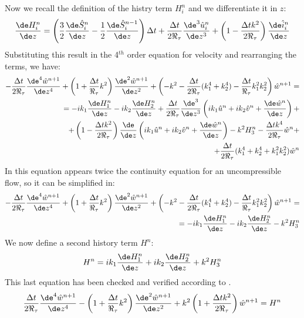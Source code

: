 Now we recall the definition of the histry term $H_i^n$ and we differentiate it in $z$:
\[
\frac{\de H_i^n}{\de z}=\left(\frac 3 2\frac{\de \hat S_i^n}{\de z}-\frac 1 2 \frac{\de \hat S_i^{n-1}}{\de z}\right)\Delta t+\frac{\Delta t}{2\Re_\tau}\frac{\de^3\hat u_i^n}{\de z^3}+\left(1-\frac{\Delta t k^2}{2\Re_\tau}\right)\frac{\de \hat i_i^n}{\de z}
\]
Substituting this result in the 4$^{th}$ order equation for velocity and rearranging the terms, we have:
\[
\begin{split}
-\frac{\Delta t}{2\Re_\tau}\frac{\de^4\hat w^{n+1}}{\de z^4}+\left(1+\frac{\Delta t}{\Re_\tau}k^2 \right)\frac{\de^2 \hat w^{n+1}}{\de z^2}+ \left(-k^2-\frac{\Delta t}{2\Re_\tau}(k_1^4+k_2^4)-\frac{\Delta t}{\Re_\tau}k_1^2k_2^2  \right)\hat w^{n+1}=\\
=-ik_1\frac{\de H_1^n}{\de z}-ik_2\frac{\de H_2^n}{\de z}+\frac{\Delta t}{2\Re_\tau}\frac{\de^3}{\de z^3}\left(ik_1\hat u^n+ik_2\hat v^n+\frac{\de\hat w^n}{\de z}  \right)+\\
+\left(1-\frac{\Delta t k^2}{2\Re_\tau}\right)\frac{\de}{\de z}\left(ik_1\hat u^n+ik_2\hat v^n+\frac{\de\hat w^n}{\de z}  \right)-k^2H_3^n-\frac{\Delta t k^4}{2\Re_\tau}\hat w^n+\\
+\frac{\Delta t}{2\Re_\tau}(k_1^4+k_2^4+k_1^2k_2^2)\hat w^n
\end{split}
\]
In this equation appears twice the continuity equation for an uncompressible flow, so it can be simplified in:
\[
\begin{split}
-\frac{\Delta t}{2\Re_\tau}\frac{\de^4\hat w^{n+1}}{\de z^4}+\left(1+\frac{\Delta t}{\Re_\tau}k^2 \right)\frac{\de^2 \hat w^{n+1}}{\de z^2}+ \left(-k^2-\frac{\Delta t}{2\Re_\tau}(k_1^4+k_2^4)-\frac{\Delta t}{\Re_\tau}k_1^2k_2^2  \right)\hat w^{n+1}=\\
=-ik_1\frac{\de H_1^n}{\de z}-ik_2\frac{\de H_2^n}{\de z}-k^2H_3^n
\end{split}
\]
We now define a second history term $H^n$:
\[
H^n=ik_1\frac{\de H_1^n}{\de z}+ik_2\frac{\de H_2^n}{\de z}+k^2H_3^n
\]
This last equation has been checked and verified according to \cite{Guasti_2012}.
\begin{equation}
\frac{\Delta t}{2\Re_\tau}\frac{\de^4\hat w^{n+1}}{\de z^4}-\left(1+\frac{\Delta t}{\Re_\tau}k^2 \right)\frac{\de^2 \hat w^{n+1}}{\de z^2}+ k^2\left(1+\frac{\Delta t k^2}{2\Re_\tau} \right)\hat w^{n+1}=H^n
\end{equation}



